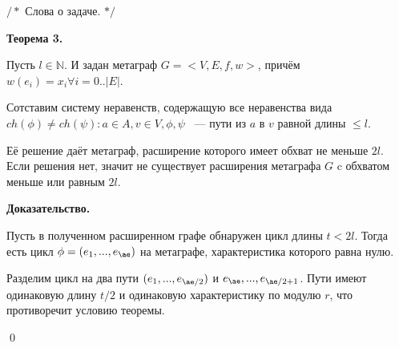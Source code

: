 \documentclass[14pt]{mmcs-article}
\begin{document}
$/*$ Слова о задаче. $*/$

\textbf{Теорема 3.}

Пусть $l \in \mathbb{N}.$ И задан метаграф $G = <V, E, f, w>$, причём $w(e_i) = x_i \forall i = 0..|E|$.

Сотставим систему неравенств, содержащую все неравенства вида $ch(\phi) \neq ch(\psi) : a \in A, v \in V, \phi, \psi$ ~--- пути из $a$ в $v$ равной длины $\leq l$.

Её решение даёт метаграф, расширение которого имеет обхват не меньше $2l$. Если решения нет, значит не существует расширения метаграфа $G$ c обхватом меньше или равным $2l$.

\textbf{Доказательство.}

Пусть в полученном расширенном графе обнаружен цикл длины $t < 2l$. Тогда есть цикл $\phi = (e_1, ..., e_{\ae})$ на метаграфе, характеристика которого равна нулю.

Разделим цикл на два пути $(e_1, ..., e_{\ae/2})$ и ${e_{\ae}, ..., e_{\ae/2 + 1}}$. Пути имеют одинаковую длину $t / 2$ и одинаковую характеристику по модулю $r$, что противоречит условию теоремы.

\qed
\end{document}
